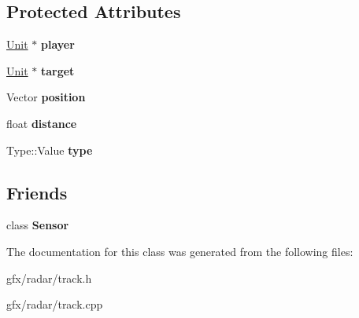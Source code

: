 \subsection*{Protected Attributes}
\begin{DoxyCompactItemize}
\item 
\hyperlink{classUnit}{Unit} $\ast$ {\bfseries player}\hypertarget{classRadar_1_1Track_a698a8137ce0327da68b6565332bc9d68}{}\label{classRadar_1_1Track_a698a8137ce0327da68b6565332bc9d68}

\item 
\hyperlink{classUnit}{Unit} $\ast$ {\bfseries target}\hypertarget{classRadar_1_1Track_af76adb232e7a151eea4e10f506bf8752}{}\label{classRadar_1_1Track_af76adb232e7a151eea4e10f506bf8752}

\item 
Vector {\bfseries position}\hypertarget{classRadar_1_1Track_a1e99019b4c468b2ca456c578b541520c}{}\label{classRadar_1_1Track_a1e99019b4c468b2ca456c578b541520c}

\item 
float {\bfseries distance}\hypertarget{classRadar_1_1Track_ad92ca0c43425695112d890aa4723f447}{}\label{classRadar_1_1Track_ad92ca0c43425695112d890aa4723f447}

\item 
Type\+::\+Value {\bfseries type}\hypertarget{classRadar_1_1Track_a2b88202d0d60ce4b96aa2830e182e884}{}\label{classRadar_1_1Track_a2b88202d0d60ce4b96aa2830e182e884}

\end{DoxyCompactItemize}
\subsection*{Friends}
\begin{DoxyCompactItemize}
\item 
class {\bfseries Sensor}\hypertarget{classRadar_1_1Track_ae29bab6174b34a6cba6ae54ab31ef8dd}{}\label{classRadar_1_1Track_ae29bab6174b34a6cba6ae54ab31ef8dd}

\end{DoxyCompactItemize}


The documentation for this class was generated from the following files\+:\begin{DoxyCompactItemize}
\item 
gfx/radar/track.\+h\item 
gfx/radar/track.\+cpp\end{DoxyCompactItemize}
